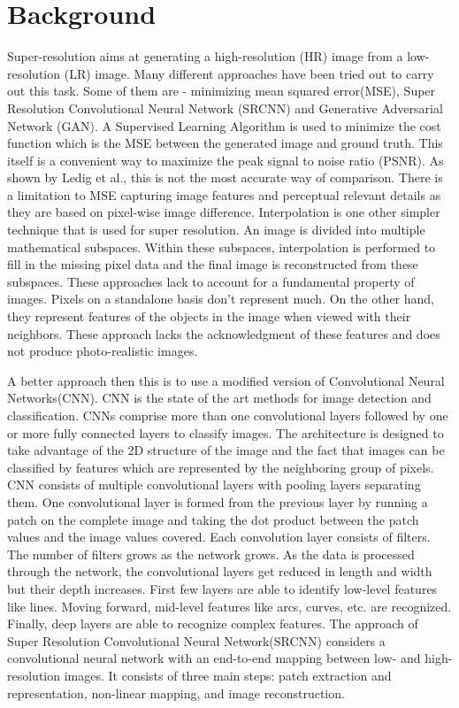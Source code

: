 \section{Background}

Super-resolution aims at generating a high-resolution (HR) image from a
low-resolution (LR) image. Many different approaches have been tried out to
carry out this task. Some of them are - minimizing mean squared error(MSE),
Super Resolution Convolutional Neural Network (SRCNN) and Generative Adversarial
Network (GAN). A Supervised Learning Algorithm is used to minimize the cost
function which is the MSE between the generated image and ground truth. This
itself is a convenient way to maximize the peak signal to noise ratio (PSNR).
As shown by Ledig et al.\cite{Ledig}, this is not the most accurate way of comparison.
There is a limitation to MSE capturing image features and perceptual relevant
details as they are based on pixel-wise image difference. Interpolation is one
other simpler technique that is used for super resolution\cite{Siu}. An image is
divided into multiple mathematical subspaces. Within these subspaces,
interpolation is performed to fill in the missing pixel data and the final image
is reconstructed from these subspaces. These approaches lack to account for a
fundamental property of images. Pixels on a standalone basis don’t represent
much. On the other hand, they represent features of the objects in the image
when viewed with their neighbors. These approach lacks the acknowledgment of
these features and does not produce photo-realistic images\cite{Ferwerda}.

A better approach then this is to use a modified version of Convolutional Neural
Networks(CNN). CNN is the state of the art methods for image detection and
classification\cite{Krizhevsky, Jaswal2014}. CNNs comprise more than one convolutional layers followed
by one or more fully connected layers to classify images. The architecture is
designed to take advantage of the 2D structure of the image and the fact that
images can be classified by features which are represented by the neighboring
group of pixels. CNN consists of multiple convolutional layers with pooling
layers separating them. One convolutional layer is formed from the previous
layer by running a patch on the complete image and taking the dot product
between the patch values and the image values covered. Each convolution layer
consists of filters. The number of filters grows as the network grows. As the
data is processed through the network, the convolutional layers get reduced in
length and width but their depth increases. First few layers are able to
identify low-level features like lines. Moving forward, mid-level features like
arcs, curves, etc. are recognized. Finally, deep layers are able to recognize
complex features. The approach of Super Resolution Convolutional Neural
Network(SRCNN)\cite{Long} considers a convolutional neural network with an end-to-end
mapping between low- and high-resolution images. It consists of three main
steps: patch extraction and representation, non-linear mapping, and image
reconstruction\cite{Long}.

